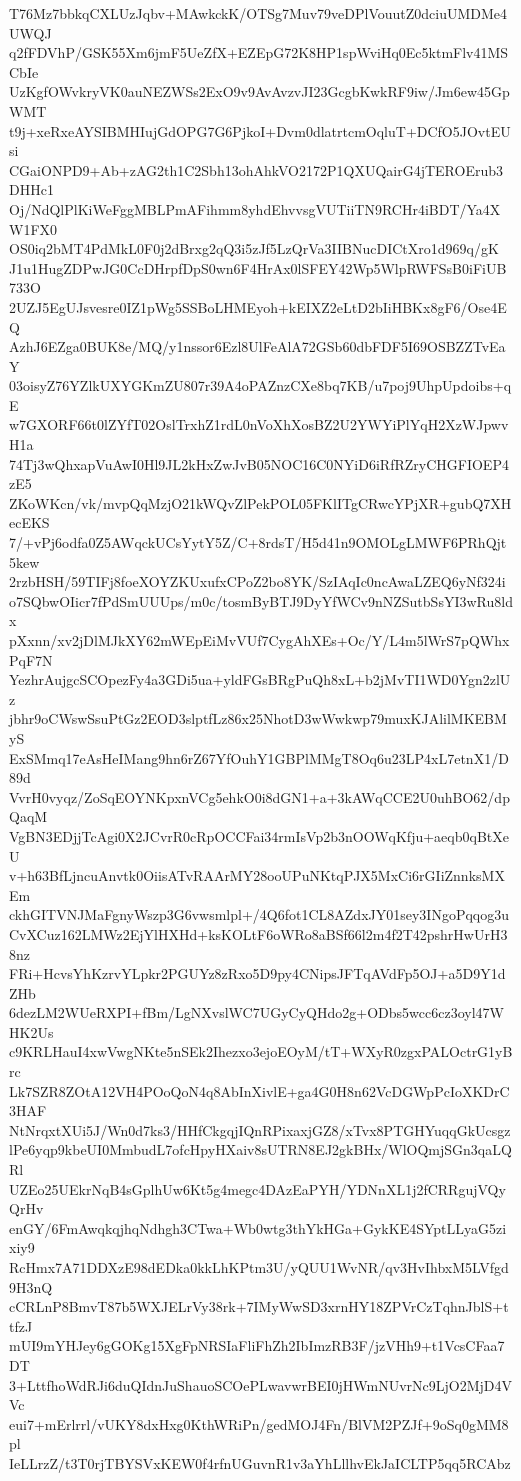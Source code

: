 T76Mz7bbkqCXLUzJqbv+MAwkckK/OTSg7Muv79veDPlVouutZ0dciuUMDMe4UWQJ
q2fFDVhP/GSK55Xm6jmF5UeZfX+EZEpG72K8HP1spWviHq0Ec5ktmFlv41MSCbIe
UzKgfOWvkryVK0auNEZWSs2ExO9v9AvAvzvJI23GcgbKwkRF9iw/Jm6ew45GpWMT
t9j+xeRxeAYSIBMHIujGdOPG7G6PjkoI+Dvm0dlatrtcmOqluT+DCfO5JOvtEUsi
CGaiONPD9+Ab+zAG2th1C2Sbh13ohAhkVO2172P1QXUQairG4jTEROErub3DHHc1
Oj/NdQlPlKiWeFggMBLPmAFihmm8yhdEhvvsgVUTiiTN9RCHr4iBDT/Ya4XW1FX0
OS0iq2bMT4PdMkL0F0j2dBrxg2qQ3i5zJf5LzQrVa3IIBNucDICtXro1d969q/gK
J1u1HugZDPwJG0CcDHrpfDpS0wn6F4HrAx0lSFEY42Wp5WlpRWFSsB0iFiUB733O
2UZJ5EgUJsvesre0IZ1pWg5SSBoLHMEyoh+kEIXZ2eLtD2bIiHBKx8gF6/Ose4EQ
AzhJ6EZga0BUK8e/MQ/y1nssor6Ezl8UlFeAlA72GSb60dbFDF5I69OSBZZTvEaY
03oisyZ76YZlkUXYGKmZU807r39A4oPAZnzCXe8bq7KB/u7poj9UhpUpdoibs+qE
w7GXORF66t0lZYfT02OslTrxhZ1rdL0nVoXhXosBZ2U2YWYiPlYqH2XzWJpwvH1a
74Tj3wQhxapVuAwI0Hl9JL2kHxZwJvB05NOC16C0NYiD6iRfRZryCHGFIOEP4zE5
ZKoWKcn/vk/mvpQqMzjO21kWQvZlPekPOL05FKlITgCRwcYPjXR+gubQ7XHecEKS
7/+vPj6odfa0Z5AWqckUCsYytY5Z/C+8rdsT/H5d41n9OMOLgLMWF6PRhQjt5kew
2rzbHSH/59TIFj8foeXOYZKUxufxCPoZ2bo8YK/SzIAqIc0ncAwaLZEQ6yNf324i
o7SQbwOIicr7fPdSmUUUps/m0c/tosmByBTJ9DyYfWCv9nNZSutbSsYI3wRu8ldx
pXxnn/xv2jDlMJkXY62mWEpEiMvVUf7CygAhXEs+Oc/Y/L4m5lWrS7pQWhxPqF7N
YezhrAujgcSCOpezFy4a3GDi5ua+yldFGsBRgPuQh8xL+b2jMvTI1WD0Ygn2zlUz
jbhr9oCWswSsuPtGz2EOD3slptfLz86x25NhotD3wWwkwp79muxKJAlilMKEBMyS
ExSMmq17eAsHeIMang9hn6rZ67YfOuhY1GBPlMMgT8Oq6u23LP4xL7etnX1/D89d
VvrH0vyqz/ZoSqEOYNKpxnVCg5ehkO0i8dGN1+a+3kAWqCCE2U0uhBO62/dpQaqM
VgBN3EDjjTcAgi0X2JCvrR0cRpOCCFai34rmIsVp2b3nOOWqKfju+aeqb0qBtXeU
v+h63BfLjncuAnvtk0OiisATvRAArMY28ooUPuNKtqPJX5MxCi6rGIiZnnksMXEm
ckhGITVNJMaFgnyWszp3G6vwsmlpl+/4Q6fot1CL8AZdxJY01sey3INgoPqqog3u
CvXCuz162LMWz2EjYlHXHd+ksKOLtF6oWRo8aBSf66l2m4f2T42pshrHwUrH38nz
FRi+HcvsYhKzrvYLpkr2PGUYz8zRxo5D9py4CNipsJFTqAVdFp5OJ+a5D9Y1dZHb
6dezLM2WUeRXPI+fBm/LgNXvslWC7UGyCyQHdo2g+ODbs5wcc6cz3oyl47WHK2Us
c9KRLHauI4xwVwgNKte5nSEk2Ihezxo3ejoEOyM/tT+WXyR0zgxPALOctrG1yBrc
Lk7SZR8ZOtA12VH4POoQoN4q8AbInXivlE+ga4G0H8n62VcDGWpPcIoXKDrC3HAF
NtNrqxtXUi5J/Wn0d7ks3/HHfCkgqjIQnRPixaxjGZ8/xTvx8PTGHYuqqGkUcsgz
lPe6yqp9kbeUI0MmbudL7ofcHpyHXaiv8sUTRN8EJ2gkBHx/WlOQmjSGn3qaLQRl
UZEo25UEkrNqB4sGplhUw6Kt5g4megc4DAzEaPYH/YDNnXL1j2fCRRgujVQyQrHv
enGY/6FmAwqkqjhqNdhgh3CTwa+Wb0wtg3thYkHGa+GykKE4SYptLLyaG5zixiy9
RcHmx7A71DDXzE98dEDka0kkLhKPtm3U/yQUU1WvNR/qv3HvIhbxM5LVfgd9H3nQ
cCRLnP8BmvT87b5WXJELrVy38rk+7IMyWwSD3xrnHY18ZPVrCzTqhnJblS+ttfzJ
mUI9mYHJey6gGOKg15XgFpNRSIaFliFhZh2IbImzRB3F/jzVHh9+t1VcsCFaa7DT
3+LttfhoWdRJi6duQIdnJuShauoSCOePLwavwrBEI0jHWmNUvrNc9LjO2MjD4VVc
eui7+mErlrrl/vUKY8dxHxg0KthWRiPn/gedMOJ4Fn/BlVM2PZJf+9oSq0gMM8pl
IeLLrzZ/t3T0rjTBYSVxKEW0f4rfnUGuvnR1v3aYhLllhvEkJaICLTP5qq5RCAbz
